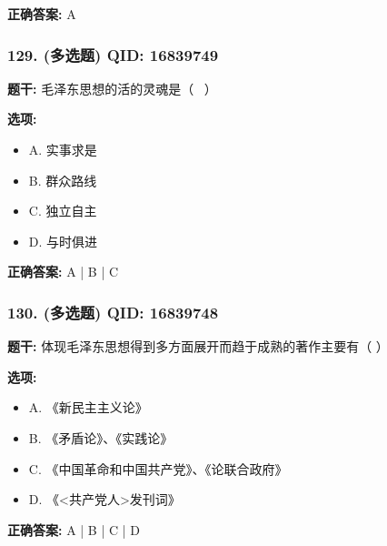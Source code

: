 \documentclass[12pt,UTF8]{ctexart}
\begin{document}
\textbf{正确答案:}
A

\vspace{0.3em}\hrulefill\vspace{0.7em}

\subsubsection*{129. (多选题) \small QID: 16839749}

\textbf{题干:}
毛泽东思想的活的灵魂是（  ）

\textbf{选项:}
\begin{itemize}[leftmargin=*]

  \item A. 实事求是

  \item B. 群众路线

  \item C. 独立自主

  \item D. 与时俱进

\end{itemize}

\textbf{正确答案:}
A | B | C

\vspace{0.3em}\hrulefill\vspace{0.7em}

\subsubsection*{130. (多选题) \small QID: 16839748}

\textbf{题干:}
体现毛泽东思想得到多方面展开而趋于成熟的著作主要有（ ）

\textbf{选项:}
\begin{itemize}[leftmargin=*]

  \item A. 《新民主主义论》

  \item B. 《矛盾论》、《实践论》

  \item C. 《中国革命和中国共产党》、《论联合政府》

  \item D. 《<共产党人>发刊词》

\end{itemize}

\textbf{正确答案:}
A | B | C | D

\vspace{0.3em}\hrulefill\vspace{0.7em}
\end{document}

